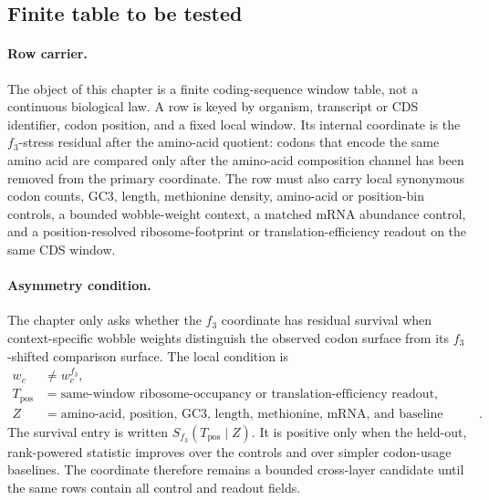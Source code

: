 \subsection{Finite table to be tested}
\label{sec:q6-f3-stress-position-resolved-table}

\paragraph{Row carrier.}
The object of this chapter is a finite coding-sequence window table, not a continuous biological law.  A row is keyed by organism, transcript or CDS identifier, codon position, and a fixed local window.  Its internal coordinate is the $f_3$-stress residual after the amino-acid quotient: codons that encode the same amino acid are compared only after the amino-acid composition channel has been removed from the primary coordinate.  The row must also carry local synonymous codon counts, GC3, length, methionine density, amino-acid or position-bin controls, a bounded wobble-weight context, a matched mRNA abundance control, and a position-resolved ribosome-footprint or translation-efficiency readout on the same CDS window.

\paragraph{Asymmetry condition.}
The chapter only asks whether the $f_3$ coordinate has residual survival when context-specific wobble weights distinguish the observed codon surface from its $f_3$-shifted comparison surface.  The local condition is
$$
\begin{aligned}
  w_c &\neq w_c^{f_3},\\
  T_{\mathrm{pos}} &= \text{same-window ribosome-occupancy or translation-efficiency readout},\\
  Z &= \text{amino-acid, position, GC3, length, methionine, mRNA, and baseline controls}.
\end{aligned}
$$
The survival entry is written $S_{f_3}(T_{\mathrm{pos}}\mid Z)$.  It is positive only when the held-out, rank-powered statistic improves over the controls and over simpler codon-usage baselines.  The coordinate therefore remains a bounded cross-layer candidate until the same rows contain all control and readout fields.
